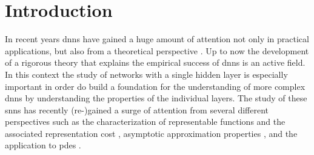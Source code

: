 \documentclass[a4paper]{article}
\numberwithin{equation}{section}
\theoremstyle{remark}
\begin{document}
\section{Introduction}\label{sec:Introduction}
In recent years \glspl{dnn} have gained
a huge amount of attention not only in practical applications,
but also from a theoretical perspective \cite{Grohs22MathematicalAspectsDeep,DeVore21NeuralNetworkApproximation}.
Up to now the development of a rigorous theory
that explains the empirical success of \glspl{dnn} is an active field.
In this context the study of networks
with a single hidden layer is especially important
in order do build a foundation
for the understanding of more complex \glspl{dnn}
by understanding the properties of the individual layers.
The study of these \glspl{snn}
has recently (re-)gained a surge of attention
from several different perspectives
such as
the characterization of representable functions
and the associated representation cost
\cite{
Abdeljawad22IntegralRepresentationsShallow,
Chizat20ImplicitBiasGradient,
Savarese19HowInfiniteWidth,
Parhi21BanachSpaceRepresenter,
Ongie20FunctionSpaceView,
},
asymptotic approximation properties
\cite{
Bach17BreakingCurseDimensionality,
Caragea23NeuralNetworkApproximation,
E22RepresentationFormulasPointwise,
Klusowski16RiskBoundsHighDimensional,
Klusowski18ApproximationCombinationsReLU,
Siegel20ApproximationRatesNeural,
Siegel22HighOrderApproximationRates,
Siegel22SharpBoundsApproximation,
Ma22UniformApproximationRates,
Voigtlaender22SamplingNumbersFourierAnalytic,
},
and the application to \glspl{pde}
\cite{
Chen21RepresentationSolutionsElliptic,
Chen23RegularityTheoryStatic,
Gonon23RandomFeatureNeural,
Lu21PrioriGeneralizationAnalysis,
Lu22PrioriGeneralizationError,
Marwah23NeuralNetworkApproximations,
}.
\end{document}
